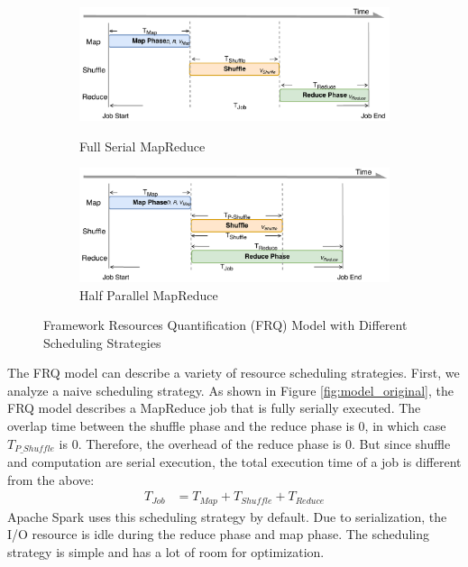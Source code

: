{\begin{figure}
	\centering
	\begin{minipage}[hb]{\linewidth}
		\begin{subfigure}{\linewidth}
			\begin{minipage}{\linewidth}
				\includegraphics[width=\linewidth]{fig/model_original}
				\caption{\color{blue}Full Serial MapReduce}
				\label{fig:model_original}
			\end{minipage}
			\begin{minipage}{\linewidth}
				\includegraphics[width=\linewidth]{fig/model_hadoop}
				\caption{\color{blue}Half Parallel MapReduce}
				\label{fig:model_hadoop}
			\end{minipage}
		\end{subfigure}
		\caption{\color{blue}Framework Resources Quantification (FRQ) Model with Different Scheduling Strategies}
		\label{fig:model_strategies}
	\end{minipage}
\end{figure}

The FRQ model can describe a variety of resource scheduling strategies. First, we analyze a naive scheduling strategy. As shown in Figure \ref{fig:model_original}, the FRQ model describes a MapReduce job that is fully serially executed. The overlap time between the shuffle phase and the reduce phase is \(0\), in which case \(T_{P\_Shuffle}\) is \(0\). Therefore, the overhead of the reduce phase is 0. But since shuffle and computation are serial execution, the total execution time of a job is different from the above:
\begin{equation}
\label{equation_Tjob2}
\begin{aligned}
    T_{Job} &= T_{Map} + T_{Shuffle} + T_{Reduce}
\end{aligned}
\end{equation}
Apache Spark uses this scheduling strategy by default. Due to serialization, the I/O resource is idle during the reduce phase and map phase. The scheduling strategy is simple and has a lot of room for optimization.

}

